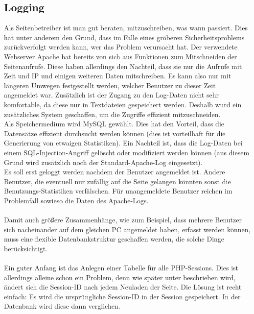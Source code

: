 \subsection{Logging}

Als Seitenbetreiber ist man gut beraten, mitzuschreiben, was wann passiert. Dies hat unter anderem den Grund, dass im Falle eines gröberen Sicherheitsproblems zurückverfolgt werden kann, wer das Problem verursacht hat. Der verwendete Webserver Apache hat bereits von sich aus Funktionen zum Mitschneiden der Seitenaufrufe. Diese haben allerdings den Nachteil, dass sie nur die Aufrufe mit Zeit und IP und einigen weiteren Daten mitschreiben. Es kann also nur mit längeren Umwegen festgestellt werden, welcher Benutzer zu dieser Zeit angemeldet war. Zusätzlich ist der Zugang zu den Log-Daten nicht sehr komfortable, da diese nur in Textdateien gespeichert werden. Deshalb wurd ein zusätzliches System geschaffen, um die Zugriffe effizient mitzuschneiden.\\
Als Speichermedium wird MySQL gewählt. Dies hat den Vorteil, dass die Datensätze effizient durchsucht werden können (dies ist vorteilhaft für die Generierung von etwaigen Statistiken). Ein Nachteil ist, dass die Log-Daten bei einem SQL-Injection-Angriff gelöscht oder modifiziert werden können (aus diesem Grund wird zusätzlich noch der Standard-Apache-Log eingesetzt).\\
Es soll erst geloggt werden nachdem der Benutzer angemeldet ist. Andere Benutzer, die eventuell nur zufällig auf die Seite gelangen könnten sonst die Benutzungs-Statistiken verfälschen. Für unangemeldete Benutzer reichen im Problemfall sowieso die Daten des Apache-Logs.\\
\\
Damit auch größere Zusammenhänge, wie zum Beispiel, dass mehrere Benutzer sich nacheinander auf dem gleichen PC angemeldet haben, erfasst werden können, muss eine flexible Datenbankstruktur geschaffen werden, die solche Dinge berücksichtigt.\\
\\
Ein guter Anfang ist das Anlegen einer Tabelle für alle PHP-Sessions. Dies ist allerdings alleine schon ein Problem, denn wie später unter  beschrieben wird, ändert sich die Session-ID nach jedem Neuladen der Seite. Die Lösung ist recht einfach: Es wird die ursprüngliche Session-ID in der Session gespeichert. In der Datenbank wird diese dann verglichen.\\
